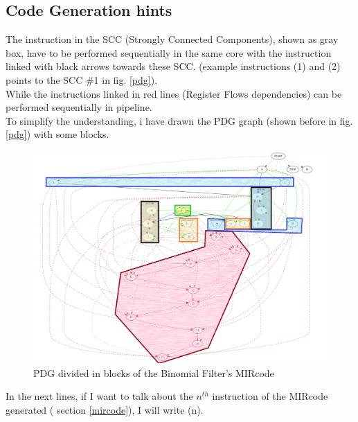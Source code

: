   \subsection{Code Generation hints}
The instruction in the SCC (Strongly Connected Components), shown as gray box, have to be performed sequentially in the same core with the instruction linked with black arrows towards these SCC. (example instructions (1) and (2) points to the SCC \#1 in fig. \ref{pdg}).\\
 While the instructions linked in red lines (Register Flows dependencies) can be performed sequentially in pipeline.\\
To simplify the understanding, i have drawn the PDG graph (shown before in fig. \ref{pdg}) with some blocks.
   \begin{figure}[h!]
   	\centering
   	\includegraphics[width=\textwidth]{imm/tessa/pdgblocks.png} 	\caption{PDG divided in blocks of the Binomial Filter's MIRcode
   	} 
   	\label{pdgblocks}
   \end{figure}
   In the next lines, if I want to talk about the $ n^{th} $ instruction of the MIRcode generated ( section \ref{mircode}), I will write (n).
